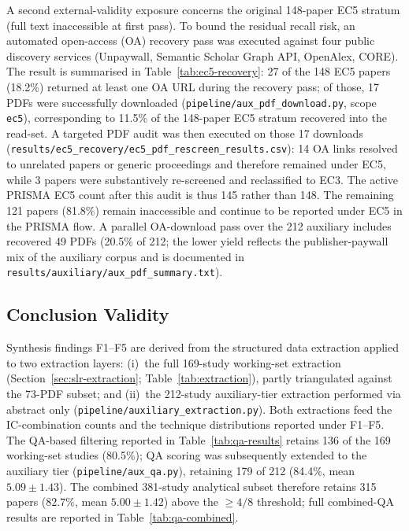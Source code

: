 





A second external-validity exposure concerns the original 148-paper EC5
stratum (full text inaccessible at first pass). To bound the residual recall
risk, an
automated open-access (OA) recovery pass was executed against four public
discovery services (Unpaywall, Semantic Scholar Graph API, OpenAlex, CORE).
The result is summarised in Table~\ref{tab:ec5-recovery}: 27 of the 148 EC5
papers (18.2\%) returned at least one OA URL during the recovery pass; of
those, 17 PDFs were successfully downloaded (\texttt{pipeline/aux\_pdf\_\allowbreak download.py}, scope \texttt{ec5}), corresponding to 11.5\% of the
148-paper EC5 stratum recovered into the read-set. A targeted PDF audit was
then executed on those 17 downloads
(\texttt{results/ec5\_recovery/ec5\_pdf\_rescreen\_results.csv}): 14 OA
links resolved to unrelated papers or generic proceedings and therefore
remained under EC5, while 3 papers were substantively re-screened and
reclassified to EC3. The active PRISMA EC5 count after this audit is thus
145 rather than 148. The remaining 121
papers (81.8\%) remain inaccessible and continue to be reported under EC5
in the PRISMA flow. A parallel OA-download pass over the 212 auxiliary
includes recovered 49 PDFs (20.5\% of 212; the lower yield reflects the
publisher-paywall mix of the auxiliary corpus and is documented in
\texttt{results/auxiliary/aux\_pdf\_summary.txt}).



\subsection{Conclusion Validity}

Synthesis findings F1--F5 are derived from the structured data extraction
applied to two extraction layers: (i)~the full 169-study working-set
extraction (Section~\ref{sec:slr-extraction};
Table~\ref{tab:extraction}), partly triangulated against the 73-PDF subset;
and (ii)~the 212-study auxiliary-tier extraction performed via abstract
only (\texttt{pipeline/auxiliary\_extraction.py}). Both extractions feed
the IC-combination counts and the technique distributions reported under
F1--F5. The QA-based filtering reported in Table~\ref{tab:qa-results}
retains 136 of the 169 working-set studies (80.5\%); QA scoring was
subsequently extended to the auxiliary tier
(\texttt{pipeline/aux\_qa.py}), retaining 179 of 212 (84.4\%, mean
$5.09 \pm 1.43$). The combined 381-study analytical subset therefore retains 315 papers
($82.7\%$, mean $5.00 \pm 1.42$) above the $\geq 4/8$ threshold; full
combined-QA results are reported in Table~\ref{tab:qa-combined}.

